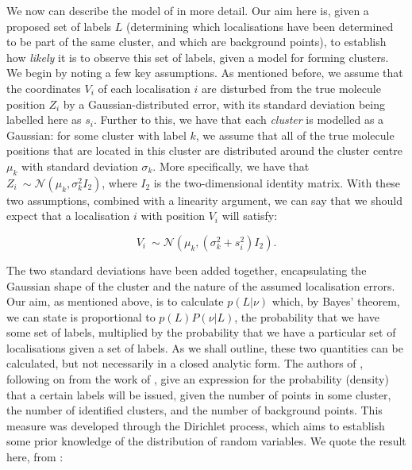 \documentclass[11pt]{article}
\begin{document}
We now can describe the model of \cite{Rubin-Delanchy2015} in more detail. Our aim here is, given a proposed set of labels $L$ (determining which localisations have been determined to be part of the same cluster, and which are background points), to establish how \textit{likely} it is to observe this set of labels, given a model for forming clusters. We begin by noting a few key assumptions. As mentioned before, we assume that the coordinates $V_i$ of each localisation $i$ are disturbed from the true molecule position $Z_i$ by a Gaussian-distributed error, with its standard deviation being labelled here as $s_i$. Further to this, we have that each \textit{cluster} is modelled as a Gaussian: for some cluster with label $k$, we assume that all of the true molecule positions that are located in this cluster are distributed around the cluster centre $\mu_k$ with standard deviation $\sigma_k$. More specifically, we have that $Z_i ~\sim \mathcal{N}(\mu_k, \sigma_k^2 I_2) $, where $I_2$ is the two-dimensional identity matrix. With these two assumptions, combined with a linearity argument, we can say that we should expect that a localisation $i$ with position $V_i$ will satisfy:

\begin{equation}
	\label{VDistribution}
V_i ~\sim \mathcal{N}(\mu_k, (\sigma_k^2 + s_i^2) I_2).
\end{equation}

The two standard deviations have been added together, encapsulating the Gaussian shape of the cluster and the nature of the assumed localisation errors. \\


Our aim, as mentioned above, is to calculate $p(L|\nu)$ which, by Bayes' theorem, we can state is proportional to $p(L)P(\nu|L)$, the probability that we have some set of labels, multiplied by the probability that we have a particular set of localisations given a set of labels. As we shall outline, these two quantities can be calculated, but not necessarily in a closed analytic form. The authors of \cite{Rubin-Delanchy2015}, following on from the work of \cite{10.1214/aos/1176342360}, give an expression for the probability (density) that a certain labels will be issued, given the number of points in some cluster, the number of identified clusters, and the number of background points. This measure was developed through the Dirichlet process, which aims to establish some prior knowledge of the distribution of random variables. We quote the result here, from \cite{Rubin-Delanchy2015}:
\end{document}
